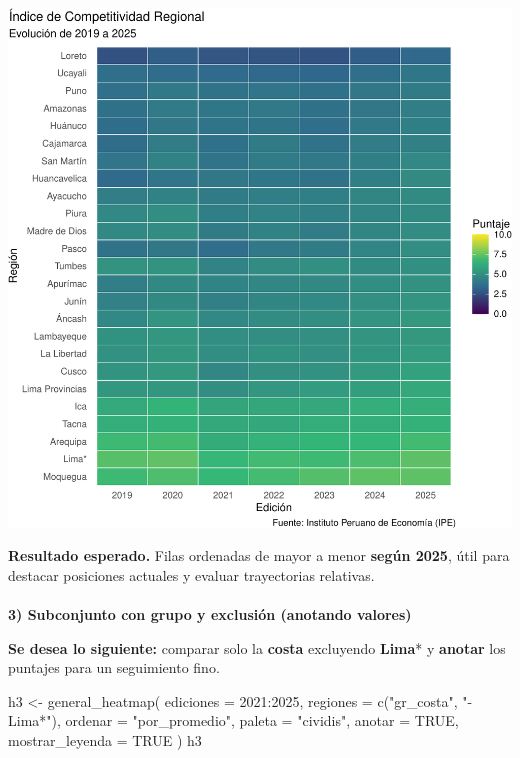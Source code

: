 \documentclass[
  11pt,
  letterpaper,
  DIV=11,
  numbers=noendperiod]{scrartcl}
\makeatletter
\let\oldparagraph\paragraph
\renewcommand{\paragraph}{
    \@ifstar
      \xxxParagraphStar
      \xxxParagraphNoStar
  }
\newcommand{\xxxParagraphStar}[1]{\oldparagraph*{#1}\mbox{}}
\newcommand{\xxxParagraphNoStar}[1]{\oldparagraph{#1}\mbox{}}
\newenvironment{Shaded}{\begin{snugshade}}{\end{snugshade}}
\newcommand{\AttributeTok}[1]{\textcolor[rgb]{0.40,0.45,0.13}{#1}}
\newcommand{\ConstantTok}[1]{\textcolor[rgb]{0.56,0.35,0.01}{#1}}
\newcommand{\DecValTok}[1]{\textcolor[rgb]{0.68,0.00,0.00}{#1}}
\newcommand{\FunctionTok}[1]{\textcolor[rgb]{0.28,0.35,0.67}{#1}}
\newcommand{\NormalTok}[1]{\textcolor[rgb]{0.00,0.23,0.31}{#1}}
\newcommand{\OtherTok}[1]{\textcolor[rgb]{0.00,0.23,0.31}{#1}}
\newcommand{\SpecialCharTok}[1]{\textcolor[rgb]{0.37,0.37,0.37}{#1}}
\newcommand{\StringTok}[1]{\textcolor[rgb]{0.13,0.47,0.30}{#1}}
\makeatother
\begin{document}
\includegraphics{Manual_files/figure-pdf/unnamed-chunk-32-1.pdf}

\textbf{Resultado esperado.} Filas ordenadas de mayor a menor
\textbf{según 2025}, útil para destacar posiciones actuales y evaluar
trayectorias relativas.

\paragraph{\texorpdfstring{\textbf{3) Subconjunto con grupo y exclusión
(anotando
valores)}}{3) Subconjunto con grupo y exclusión (anotando valores)}}\label{subconjunto-con-grupo-y-exclusiuxf3n-anotando-valores}

\textbf{Se desea lo siguiente:} comparar solo la \textbf{costa}
excluyendo \textbf{Lima}* y \textbf{anotar} los puntajes para un
seguimiento fino.

\begin{Shaded}
\begin{Highlighting}[]
\NormalTok{h3 }\OtherTok{\textless{}{-}} \FunctionTok{general\_heatmap}\NormalTok{(}
  \AttributeTok{ediciones =} \DecValTok{2021}\SpecialCharTok{:}\DecValTok{2025}\NormalTok{,}
  \AttributeTok{regiones  =} \FunctionTok{c}\NormalTok{(}\StringTok{"gr\_costa"}\NormalTok{, }\StringTok{"{-}Lima*"}\NormalTok{),}
  \AttributeTok{ordenar   =} \StringTok{"por\_promedio"}\NormalTok{,}
  \AttributeTok{paleta    =} \StringTok{"cividis"}\NormalTok{,}
  \AttributeTok{anotar    =} \ConstantTok{TRUE}\NormalTok{,}
  \AttributeTok{mostrar\_leyenda =} \ConstantTok{TRUE}
\NormalTok{)}
\NormalTok{h3}
\end{Highlighting}
\end{Shaded}
\end{document}

